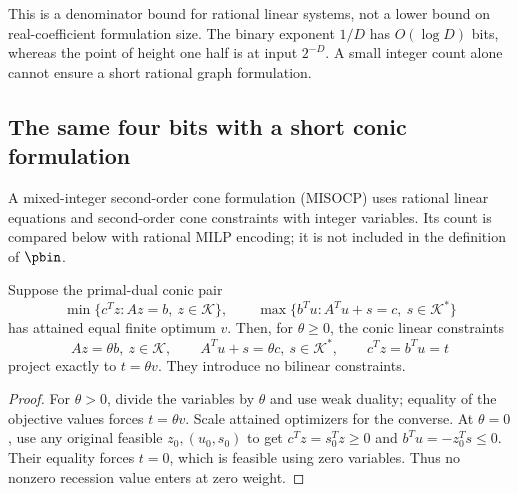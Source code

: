 This is a denominator bound for rational linear systems, not a lower
bound on real-coefficient formulation size. The binary exponent $1/D$
has $O(\log D)$ bits, whereas the point of height one half is at
input $2^{-D}$. A small integer count alone cannot ensure a short
rational graph formulation.

\subsection{The same four bits with a short conic formulation}

A mixed-integer second-order cone formulation (MISOCP) uses rational
linear equations and second-order cone constraints with integer
variables. Its count is compared below with rational MILP encoding;
it is not included in the definition of $\pbin$.

\begin{lemma}\label{lem:conic-value}
Suppose the primal-dual conic pair
\[
 \min\{c^Tz:Az=b,\ z\in\mathcal K\},\qquad
 \max\{b^Tu:A^Tu+s=c,\ s\in\mathcal K^*\}
\]
has attained equal finite optimum $v$. Then, for $\theta\ge0$,
the conic linear constraints
\begin{equation}\label{eq:conic-value-homogeneous}
 Az=\theta b,\ z\in\mathcal K,\qquad
 A^Tu+s=\theta c,\ s\in\mathcal K^*,\qquad
 c^Tz=b^Tu=t
\end{equation}
project exactly to $t=\theta v$. They introduce no bilinear constraints.
\end{lemma}
\begin{proof}
For $\theta>0$, divide the variables by $\theta$ and use weak
duality; equality of the objective values forces $t=\theta v$.
Scale attained optimizers for the converse. At $\theta=0$, use any
original feasible $z_0,(u_0,s_0)$ to get
$c^Tz=s_0^Tz\ge0$ and $b^Tu=-z_0^Ts\le0$. Their equality forces
$t=0$, which is feasible using zero variables. Thus no nonzero
recession value enters at zero weight.
\end{proof}

